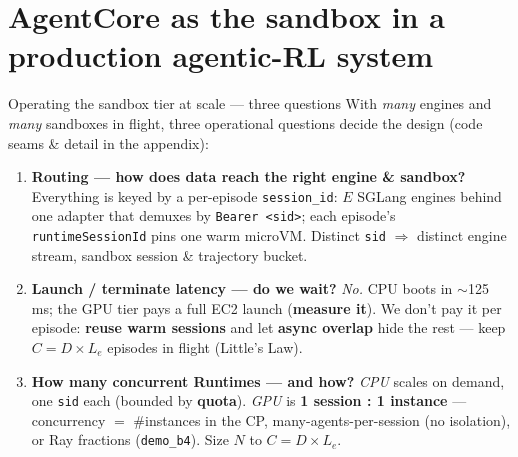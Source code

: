\documentclass[aspectratio=169]{beamer}
\begin{document}
\section{AgentCore as the sandbox in a production agentic-RL system}

\begin{frame}{Operating the sandbox tier at scale --- three questions}
  \footnotesize With \emph{many} engines and \emph{many} sandboxes in flight, three operational questions
  decide the design (code seams \& detail in the appendix):
  \vspace{0.3em}
  \begin{enumerate}\setlength\itemsep{0.6em}
    \item[\textbf{1}] \textbf{Routing --- how does data reach the right engine \& sandbox?} Everything is
      keyed by a per-episode \texttt{session\_id}: $E$ SGLang engines behind one adapter that demuxes by
      \texttt{Bearer <sid>}; each episode's \texttt{runtimeSessionId} pins one warm microVM. Distinct
      \texttt{sid} $\Rightarrow$ distinct engine stream, sandbox session \& trajectory bucket.
    \item[\textbf{2}] \textbf{Launch / terminate latency --- do we wait?} \emph{No.} CPU boots in
      $\sim$125\,ms; the GPU tier pays a full EC2 launch (\textbf{measure it}). We don't pay it per episode:
      \textbf{reuse warm sessions} and let \textbf{async overlap} hide the rest --- keep $C = D \times L_e$
      episodes in flight (Little's Law).
    \item[\textbf{3}] \textbf{How many concurrent Runtimes --- and how?} \emph{CPU} scales on demand, one
      \texttt{sid} each (bounded by \textbf{quota}). \emph{GPU} is \textbf{1 session : 1 instance} ---
      concurrency $=$ \#instances in the CP, many-agents-per-session (no isolation), or Ray fractions
      (\texttt{demo\_b4}). Size $N$ to $C = D \times L_e$.
  \end{enumerate}
\end{frame}
\end{document}
